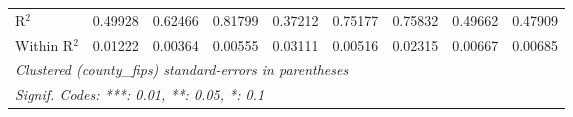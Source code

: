\begin{tabular}{lcccccccc}
   R$^2$                & 0.49928         & 0.62466                     & 0.81799                          & 0.37212                       & 0.75177                       & 0.75832                      & 0.49662              & 0.47909\\  
   Within R$^2$         & 0.01222         & 0.00364                     & 0.00555                          & 0.03111                       & 0.00516                       & 0.02315                      & 0.00667              & 0.00685\\  
   \midrule \midrule
   \multicolumn{9}{l}{\emph{Clustered (county\_fips) standard-errors in parentheses}}\\
   \multicolumn{9}{l}{\emph{Signif. Codes: ***: 0.01, **: 0.05, *: 0.1}}\\
\end{tabular}
\par\endgroup



